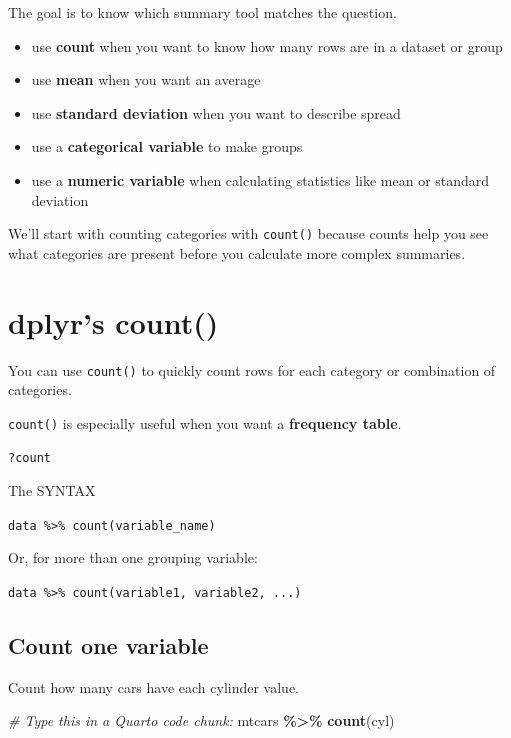 \documentclass[
]{article}
\newenvironment{Shaded}{\begin{snugshade}}{\end{snugshade}}
\newcommand{\CommentTok}[1]{\textcolor[rgb]{0.56,0.35,0.01}{\textit{#1}}}
\newcommand{\FunctionTok}[1]{\textcolor[rgb]{0.13,0.29,0.53}{\textbf{#1}}}
\newcommand{\NormalTok}[1]{#1}
\newcommand{\SpecialCharTok}[1]{\textcolor[rgb]{0.81,0.36,0.00}{\textbf{#1}}}
\begin{document}
The goal is to know which summary tool matches the question.

\begin{itemize}
\item
  use \textbf{count} when you want to know how many rows are in a
  dataset or group
\item
  use \textbf{mean} when you want an average
\item
  use \textbf{standard deviation} when you want to describe spread
\item
  use a \textbf{categorical variable} to make groups
\item
  use a \textbf{numeric variable} when calculating statistics like mean
  or standard deviation
\end{itemize}

We'll start with counting categories with \texttt{count()} because
counts help you see what categories are present before you calculate
more complex summaries.

\section{dplyr's count()}\label{dplyr-count}

You can use \texttt{count()} to quickly count rows for each category or
combination of categories.

\texttt{count()} is especially useful when you want a \textbf{frequency
table}.

\texttt{?count}

The SYNTAX

\texttt{data\ \%\textgreater{}\%\ count(variable\_name)}

Or, for more than one grouping variable:

\texttt{data\ \%\textgreater{}\%\ count(variable1,\ variable2,\ ...)}

\subsection{Count one variable}\label{count-one-variable}

Count how many cars have each cylinder value.

\begin{Shaded}
\begin{Highlighting}[]
\CommentTok{\#  Type this in a Quarto code chunk:}
\NormalTok{mtcars }\SpecialCharTok{\%\textgreater{}\%}
  \FunctionTok{count}\NormalTok{(cyl)}
\end{Highlighting}
\end{Shaded}
\end{document}
